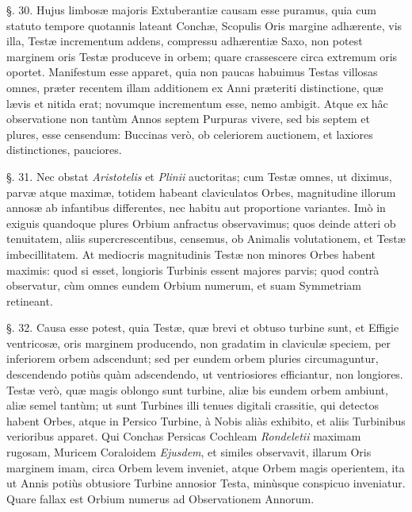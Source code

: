 \documentclass[a4paper, 11pt, oneside, polutonikogreek, german]{article}
\begin{document}
§. 30. Hujus limbosæ majoris Extuberantiæ causam esse puramus, quia cum statuto tempore quotannis lateant Conchæ, Scopulis Oris margine adhærente, vis illa, Testæ incrementum addens, compressu adhærentiæ Saxo, non potest marginem oris Testæ produceve in orbem; quare crassescere circa extremum oris oportet. Manifestum esse apparet, quia non paucas habuimus Testas villosas omnes, præter recentem illam additionem ex Anni præteriti distinctione, quæ lævis et nitida erat; novumque incrementum esse, nemo ambigit. Atque ex hâc observatione non tantùm Annos septem Purpuras vivere, sed bis septem et plures, esse censendum: Buccinas verò, ob celeriorem auctionem, et laxiores distinctiones, pauciores.

§. 31. Nec obstat \emph{Aristotelis} et \emph{Plinii} auctoritas; cum Testæ omnes, ut diximus, parvæ atque maximæ, totidem habeant claviculatos Orbes, magnitudine illorum annosæ ab infantibus differentes, nec habitu aut proportione variantes. Imò in exiguis quandoque plures Orbium anfractus observavimus; quos deinde atteri ob tenuitatem, aliis supercrescentibus, censemus, ob Animalis volutationem, et Testæ imbecillitatem. At mediocris magnitudinis Testæ non minores Orbes habent maximis: quod si esset, longioris Turbinis essent majores parvis; quod contrà observatur, cùm omnes eundem Orbium numerum, et suam Symmetriam retineant.

§. 32. Causa esse potest, quia Testæ, quæ brevi et obtuso turbine sunt, et Effigie ventricosæ, oris marginem producendo, non gradatim in claviculæ speciem, per inferiorem orbem adscendunt; sed per eundem orbem pluries circumaguntur, descendendo potiùs quàm adscendendo, ut ventriosiores efficiantur, non longiores. Testæ verò, quæ magis oblongo sunt turbine, aliæ bis eundem orbem ambiunt, aliæ semel tantùm; ut sunt Turbines illi tenues digitali crassitie, qui detectos habent Orbes, atque in Persico Turbine, à Nobis aliàs exhibito, et aliis Turbinibus verioribus apparet. Qui Conchas Persicas Cochleam \emph{Rondeletii} maximam rugosam, Muricem Coraloidem \emph{Ejusdem}, et similes observavit, illarum Oris marginem imam, circa Orbem levem inveniet, atque Orbem magis operientem, ita ut Annis potiùs obtusiore Turbine annosior Testa, minùsque conspicuo inveniatur. Quare fallax est Orbium numerus ad Observationem Annorum.
\end{document}
